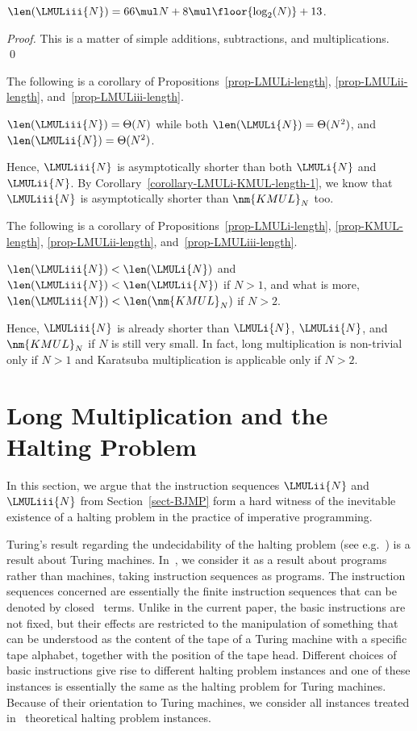 \documentclass{llncs}
\begin{document}
\begin{proposition}
\label{prop-LMULiii-length}
$\len(\LMULiii{N}) = 66 \mul N + 8 \mul \floor{\log_2(N)} + 13$.
\end{proposition}
\begin{proof}
This is a matter of simple additions, subtractions, and multiplications.
\linebreak[2]
\qed
\end{proof}

The following is a corollary of Propositions~\ref{prop-LMULi-length}, 
\ref{prop-LMULii-length}, and~\ref{prop-LMULiii-length}.
\begin{corollary}
$\len(\LMULiii{N}) = \Theta(N)$ while both
$\len(\LMULi{N}) = \Theta(N^2)$, and $\len(\LMULii{N}) = \Theta(N^2)$.
\end{corollary}
Hence, $\LMULiii{N}$ is asymptotically shorter than both $\LMULi{N}$ and
$\LMULii{N}$.
By Corollary~\ref{corollary-LMULi-KMUL-length-1}, we know that 
$\LMULiii{N}$ is asymptotically shorter than $\nm{KMUL}_N$ too.

The following is a corollary of Propositions~\ref{prop-LMULi-length}, 
\ref{prop-KMUL-length}, \ref{prop-LMULii-length}, 
and~\ref{prop-LMULiii-length}.
\begin{corollary}
$\len(\LMULiii{N}) < \len(\LMULi{N})$ and
$\len(\LMULiii{N}) < \len(\LMULii{N})$ if $N > 1$, and what is more, 
$\len(\LMULiii{N}) < \len(\nm{KMUL}_N)$ if $N > 2$.
\end{corollary}
Hence, $\LMULiii{N}$ is already shorter than $\LMULi{N}$, $\LMULii{N}$, 
and $\nm{KMUL}_N$ if $N$ is still very small.
In fact, long multiplication is non-trivial only if $N > 1$ and 
Karatsuba multiplication is applicable only if $N > 2$.

\section{Long Multiplication and the Halting Problem}
\label{sect-HP}

In this section, we argue that the instruction sequences $\LMULii{N}$ 
and $\LMULiii{N}$ from Section~\ref{sect-BJMP} form a hard witness of 
the inevitable existence of a halting problem in the practice of 
imperative programming.

Turing's result regarding the undecidability of the halting problem 
(see e.g.~\cite{Tur37a}) is a result about Turing machines.
In~\cite{BM09k}, we consider it as a result about programs rather than 
machines, taking instruction sequences as programs.
The instruction sequences concerned are essentially the finite 
instruction sequences that can be denoted by closed \PGAbj\ terms.
Unlike in the current paper, the basic instructions are not fixed, but 
their effects are restricted to the manipulation of something that can 
be understood as the content of the tape of a Turing machine with a 
specific tape alphabet, together with the position of the tape head.
Different choices of basic instructions give rise to different halting 
problem instances and one of these instances is essentially the same as 
the halting problem for Turing machines.
Because of their orientation to Turing machines, we consider all 
instances treated in~\cite{BM09k} theoretical halting problem instances.
\end{document}
